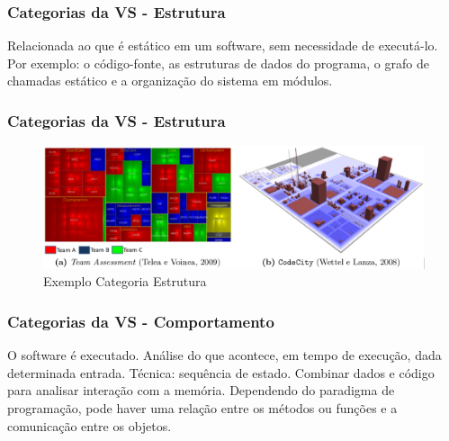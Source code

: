 \documentclass{beamer}
\begin{document}

\begin{frame}
\frametitle{Categorias da VS - Estrutura}

\center
Relacionada ao que é estático em um software, sem necessidade de executá-lo. Por exemplo: o código-fonte, as estruturas de dados do programa, o grafo de chamadas estático e a organização do sistema em módulos.

\end{frame}


\begin{frame}
\frametitle{Categorias da VS - Estrutura}

\begin{figure}[!htb]
  \centering
    \includegraphics[keepaspectratio=true,scale=0.26]
    {../figuras/codeTeam_codeCity.eps}
  \caption{Exemplo Categoria Estrutura \cite{messias2012}}
  \label{fig:parallel}
\end{figure}


\end{frame}


\begin{frame}
\frametitle{Categorias da VS - Comportamento}

\center
O software é executado. Análise do que acontece, em tempo de execução, dada determinada entrada. Técnica: sequência de estado. Combinar dados e código para analisar interação com a memória. Dependendo do paradigma de programação, pode haver uma relação entre os métodos ou funções e a comunicação entre os objetos.


\end{frame}

\end{document}
